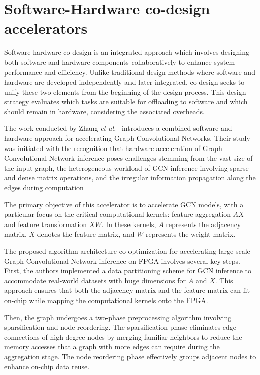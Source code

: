 \section{Software-Hardware co-design accelerators}
\label{sec:software-hardware-accelerators}%

Software-hardware co-design is an integrated approach which involves designing both software and hardware components collaboratively to enhance system performance and efficiency.
Unlike traditional design methods where software and hardware are developed independently and later integrated, co-design seeks to unify these two elements from the beginning of the design process.
This design strategy evaluates which tasks are suitable for offloading to software and which should remain in hardware, considering the associated overheads.

The work conducted by Zhang \textit{et al.}~\cite{9153263} introduces a combined software and hardware approach for accelerating Graph Convolutional Networks.
Their study was initiated with the recognition that hardware acceleration of Graph Convolutional Network inference poses challenges stemming from the vast size of the input graph,
the heterogeneous workload of GCN inference involving sparse and dense matrix operations, and the irregular information propagation along the edges during computation

The primary objective of this accelerator is to accelerate GCN models, with a particular focus on the critical computational kernels: feature aggregation $AX$ and feature transformation $XW$.
In these kernels, $A$ represents the adjacency matrix, $X$ denotes the feature matrix, and $W$ represents the weight matrix.

The proposed algorithm-architecture co-optimization for accelerating large-scale Graph Convolutional Network inference on FPGA involves several key steps.
First, the authors implemented a data partitioning scheme for GCN inference to accommodate real-world datasets with huge dimensions for $A$ and $X$.
This approach ensures that both the adjacency matrix and the feature matrix can fit on-chip while mapping the computational kernels onto the FPGA\@.

Then, the graph undergoes a two-phase preprocessing algorithm involving sparsification and node reordering. 
The sparsification phase eliminates edge connections of high-degree nodes by merging familiar neighbors to reduce the memory accesses that a graph with more edges can require during the aggregation stage.
The node reordering phase effectively groups adjacent nodes to enhance on-chip data reuse.

